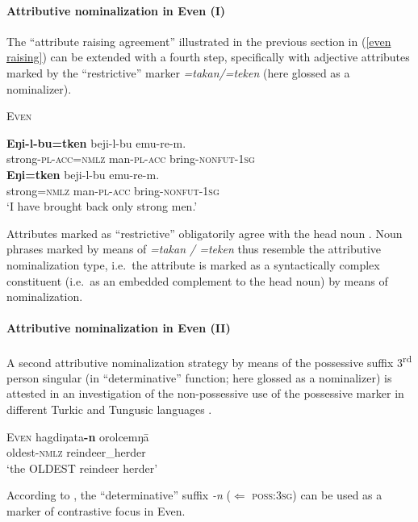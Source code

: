 \paragraph{Attributive nominalization in Even (I)}
The “attribute raising agreement” illustrated in the previous section in (\ref{even raising}) can be extended with a fourth step, specifically with adjective attributes marked by the “restrictive” marker \textit{=takan/=teken} (here glossed as a nominalizer).
\begin{exe}
\ex \textsc{Even} \cite[32]{malchukov1995}
\begin{xlist}
\ex 
\gll	\textbf{Eŋi-l-bu=tken} beji-l-bu emu-re-m.\\
	strong-\textsc{pl}-\textsc{acc}=\textsc{nmlz} man-\textsc{pl}-\textsc{acc} bring-\textsc{nonfut}-\textsc{1sg}\\
\ex	
\gll	* \textbf{Eŋi=tken} beji-l-bu emu-re-m.\\
	{} strong=\textsc{nmlz} man-\textsc{pl}-\textsc{acc} bring-\textsc{nonfut}-\textsc{1sg}\\
\glt	‘I have brought back only strong men.’
\end{xlist}
\end{exe}
Attributes marked as “restrictive” obligatorily agree with the head noun \cite[32]{malchukov1995}. Noun phrases marked by means of \textit{=takan / =teken} thus resemble the attributive nominalization type, i.e.~the attribute is marked as a syntactically complex constituent (i.e.~as an embedded complement to the head noun) by means of nominalization.

\paragraph{Attributive nominalization in Even (II)}
A second attributive nominalization strategy by means of the possessive suffix 3\textsuperscript{rd} person singular (in “determinative” function; here glossed as a nominalizer) is attested in an investigation of the non-possessive use of the possessive marker in different Turkic and Tungusic languages \citep{benzing1993b}.
\begin{exe}
\ex \textsc{Even} \cite[17–18 Footnote 58]{benzing1993b}
\gll	hagdiŋata\textbf{-n} orolcemŋā\\
	oldest-\textsc{nmlz} reindeer\_herder\\
\glt	‘the OLDEST reindeer herder’
\end{exe}
According to \citet[17–18 Footnote 58]{benzing1993b}, the “determinative” suffix {\it -n} ($\Leftarrow$ \textsc{poss:3sg}) can be used as a marker of contrastive focus in Even.

